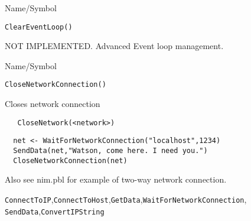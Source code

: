 \rl



\begin{desc}{Name/Symbol}
\item[Name/Symbol]  	\verb+ClearEventLoop()+

\item[Description]  	NOT IMPLEMENTED. Advanced Event loop management.

\item[Usage]		

\item[Example]	

\item[See Also]	
\end{desc}

\rl



\begin{desc}{Name/Symbol}
\item[Name/Symbol]	\verb+CloseNetworkConnection()+

\item[Description]	Closes network connection

\item[Usage]
\begin{verbatim}
   CloseNetwork(<network>)
\end{verbatim}

\item[Example]	

\begin{verbatim}
  net <- WaitForNetworkConnection("localhost",1234)
  SendData(net,"Watson, come here. I need you.")
  CloseNetworkConnection(net)
\end{verbatim}
Also see nim.pbl for example of two-way network connection.
\item[See Also]
  \verb+ConnectToIP+,\verb+ConnectToHost+,\verb+GetData+,\verb+WaitForNetworkConnection+,
   \verb+SendData+,\verb+ConvertIPString+
\end{desc}

\rl



